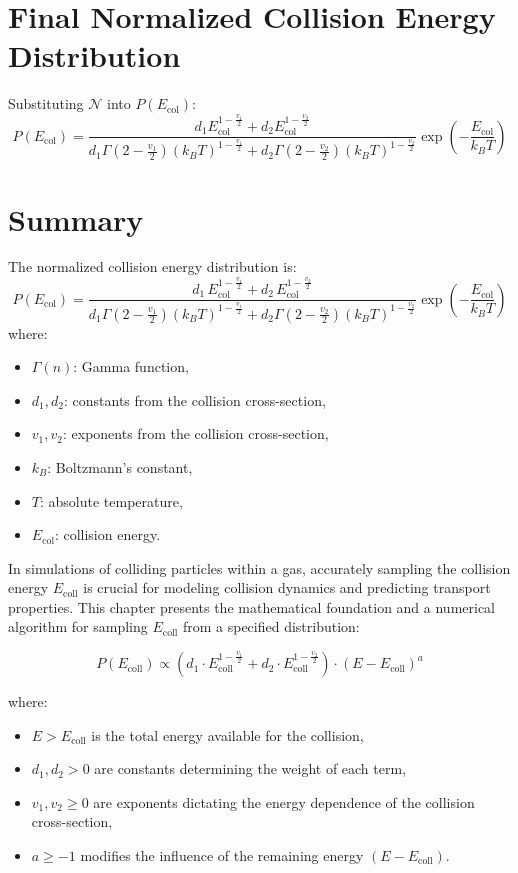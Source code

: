 \section{Final Normalized Collision Energy Distribution}
Substituting \( \mathcal{N} \) into \( P(E_{\text{col}}) \):
\[
P(E_{\text{col}}) = \frac{d_1 E_{\text{col}}^{1 - \frac{v_1}{2}} + d_2 E_{\text{col}}^{1 - \frac{v_2}{2}}}{d_1 \Gamma\left(2 - \frac{v_1}{2}\right) (k_B T)^{1 - \frac{v_1}{2}} + d_2 \Gamma\left(2 - \frac{v_2}{2}\right) (k_B T)^{1 - \frac{v_2}{2}}} \exp\left( -\frac{E_{\text{col}}}{k_B T} \right)
\]

\section{Summary}
The normalized collision energy distribution is:
\[
P(E_{\text{col}}) = \frac{d_1 \, E_{\text{col}}^{1 - \frac{v_1}{2}} + d_2 \, E_{\text{col}}^{1 - \frac{v_2}{2}}}{d_1 \Gamma\left(2 - \frac{v_1}{2}\right) (k_B T)^{1 - \frac{v_1}{2}} + d_2 \Gamma\left(2 - \frac{v_2}{2}\right) (k_B T)^{1 - \frac{v_2}{2}}} \exp\left( -\frac{E_{\text{col}}}{k_B T} \right)
\]
where:
\begin{itemize}
    \item \( \Gamma(n) \): Gamma function,
    \item \( d_1, d_2 \): constants from the collision cross-section,
    \item \( v_1, v_2 \): exponents from the collision cross-section,
    \item \( k_B \): Boltzmann's constant,
    \item \( T \): absolute temperature,
    \item \( E_{\text{col}} \): collision energy.
\end{itemize}




In simulations of colliding particles within a gas, accurately sampling the collision energy \( E_{\text{coll}} \) is crucial for modeling collision dynamics and predicting transport properties. This chapter presents the mathematical foundation and a numerical algorithm for sampling \( E_{\text{coll}} \) from a specified distribution:

\[
P(E_{\text{coll}}) \propto \left( d_1 \cdot E_{\text{coll}}^{1 - \frac{v_1}{2}} + d_2 \cdot E_{\text{coll}}^{1 - \frac{v_2}{2}} \right) \cdot (E - E_{\text{coll}})^a
\]

where:
\begin{itemize}
    \item \( E > E_{\text{coll}} \) is the total energy available for the collision,
    \item \( d_1, d_2 > 0 \) are constants determining the weight of each term,
    \item \( v_1, v_2 \geq 0 \) are exponents dictating the energy dependence of the collision cross-section,
    \item \( a \geq -1 \) modifies the influence of the remaining energy \( (E - E_{\text{coll}}) \).
\end{itemize}

